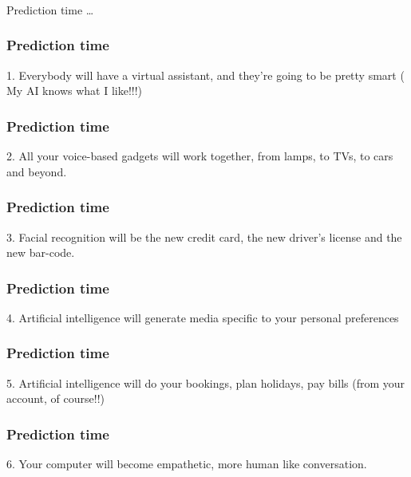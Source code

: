 \begin{frame}[fragile]\frametitle{}
\begin{center}
{\Large Prediction time \ldots}
\end{center}
\end{frame}



\begin{frame}[fragile]\frametitle{Prediction time}
1. Everybody will have a virtual assistant, and they're going to be pretty smart ( My AI knows what I like!!!)
\end{frame}

\begin{frame}[fragile]\frametitle{Prediction time}
2. All your voice-based gadgets will work together, from lamps, to TVs, to cars and beyond. 
\end{frame}

\begin{frame}[fragile]\frametitle{Prediction time}
3. Facial recognition will be the new credit card, the new driver's license and the new bar-code.
\end{frame}

\begin{frame}[fragile]\frametitle{Prediction time}
4. Artificial intelligence will generate media specific to your personal preferences
\end{frame}

\begin{frame}[fragile]\frametitle{Prediction time}
5. Artificial intelligence will do your bookings, plan holidays, pay bills (from your account, of course!!)
\end{frame}

\begin{frame}[fragile]\frametitle{Prediction time}
6. Your computer will become empathetic, more human like conversation.
\end{frame}

